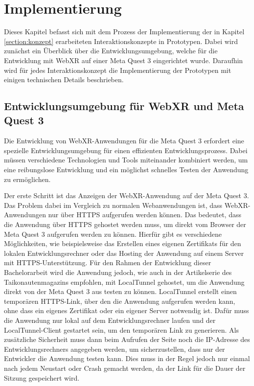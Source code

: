 \chapter{Implementierung}

Dieses Kapitel befasst sich mit dem Prozess der Implementierung der in Kapitel \ref{section:konzept} erarbeiteten Interaktionskonzepte in Prototypen.
Dabei wird zunächst ein Überblick über die Entwicklungsumgebung, welche für die Entwicklung mit WebXR auf einer Meta Quest 3 eingerichtet wurde.
Daraufhin wird für jedes Interaktionskonzept die Implementierung der Prototypen mit einigen technischen Details beschrieben.

\section{Entwicklungsumgebung für WebXR und Meta Quest 3}

Die Entwicklung von WebXR-Anwendungen für die Meta Quest 3 erfordert eine spezielle Entwicklungsumgebung für einen effizienten Entwicklungsprozess.
Dabei müssen verschiedene Technologien und Tools miteinander kombiniert werden, um eine reibungslose Entwicklung und ein möglichst schnelles Testen der Anwendung zu ermöglichen.

Der erste Schritt ist das Anzeigen der WebXR-Anwendung auf der Meta Quest 3.
Das Problem dabei im Vergleich zu \glqq{}normalen\grqq{} Webanwendungen ist, dass WebXR-Anwendungen nur über HTTPS aufgerufen werden können.
Das bedeutet, dass die Anwendung über HTTPS gehostet werden muss, um direkt vom Browser der Meta Quest 3 aufgerufen werden zu können.
Hierfür gibt es verschiedene Möglichkeiten, wie beispielsweise das Erstellen eines eigenen Zertifikats für den lokalen Entwicklungsrechner oder das Hosting der Anwendung auf einem Server mit HTTPS-Unterstützung.
Für den Rahmen der Entwicklung dieser Bachelorarbeit wird die Anwendung jedoch, wie auch in der Artikelserie des Taikonautenmagazins \autocite[Part 0/8]{taikonauten-magazine} empfohlen, mit LocalTunnel gehostet, um die Anwendung direkt von der Meta Quest 3 aus testen zu können.
LocalTunnel erstellt einen temporären HTTPS-Link, über den die Anwendung aufgerufen werden kann, ohne dass ein eigenes Zertifikat oder ein eigener Server notwendig ist.
Dafür muss die Anwendung nur lokal auf dem Entwicklungsrechner laufen und der LocalTunnel-Client gestartet sein, um den temporären Link zu generieren.
Als zusätzliche Sicherheit muss dann beim Aufrufen der Seite noch die IP-Adresse des Entwicklungsrechners angegeben werden, um sicherzustellen, dass nur der Entwickler die Anwendung testen kann.
Dies muss in der Regel jedoch nur einmal nach jedem Neustart oder Crash gemacht werden, da der Link für die Dauer der Sitzung gespeichert wird.

